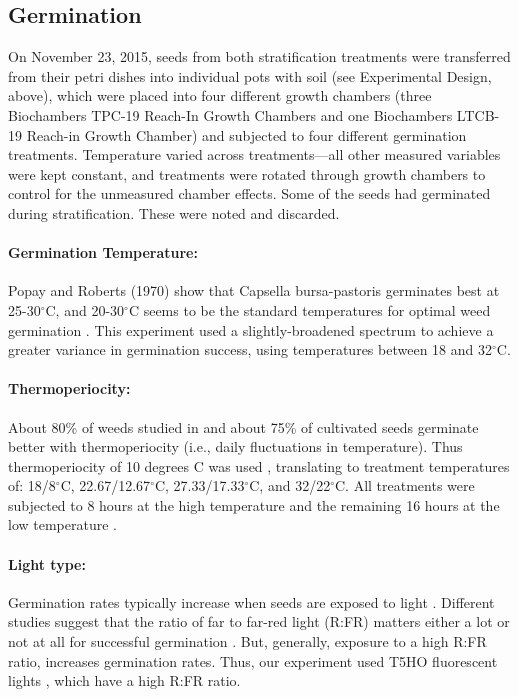 \documentclass[12pt]{article}\usepackage[]{graphicx}\usepackage[]{color}
\begin{document}
	\subsection{Germination }
	On November 23, 2015, seeds from both stratification treatments were transferred from their petri dishes into individual pots with soil (see Experimental Design, above), which were placed into four different growth chambers (three Biochambers TPC-19 Reach-In Growth Chambers and one Biochambers LTCB-19 Reach-in Growth Chamber) and subjected to four different germination treatments. Temperature varied across treatments---all other measured variables were kept constant, and treatments were rotated through growth chambers to control for the unmeasured chamber effects. Some of the seeds had germinated during stratification. These were noted and discarded.
	
	\paragraph{Germination Temperature:} Popay and Roberts (1970) show that Capsella bursa-pastoris germinates best at 25-30$^\circ$C, and 20-30$^\circ$C seems to be the standard temperatures for optimal weed germination \parencite{Hartmann2010,Steinbauer1957,Wulff1994}. This experiment used a slightly-broadened spectrum to achieve a greater variance in germination success, using temperatures between 18 and 32$^\circ$C. 
	
	\paragraph{Thermoperiocity:} About 80\% of weeds studied in \textcite{Steinbauer1957} and about 75\% of cultivated seeds germinate better with thermoperiocity (i.e., daily fluctuations in temperature)\parencite{Toole1963,ISTA1954}. Thus thermoperiocity of 10 degrees C was used \parencite[see e.g.,][]{Steinbauer1957}, translating to treatment temperatures of: 18/8$^\circ$C, 22.67/12.67$^\circ$C, 27.33/17.33$^\circ$C, and 32/22$^\circ$C. All treatments were subjected to 8 hours at the high temperature and the remaining 16 hours at the low temperature \parencite{Baskin1998,Roberts1981,Popay1970,Probert2000}.
	

	\paragraph{Light type:} Germination rates typically increase when seeds are exposed to light \parencite[e.g.,][]{Baskin1998,Pons2000,Popay1970}. Different studies suggest that the ratio of far to far-red light (R:FR) matters either a lot or not at all for successful germination \parencite[e.g.,][]{Popay1970,Pons2000,Wulff1994}. But, generally, exposure to a high R:FR ratio, increases germination rates. Thus, our experiment used T5HO fluorescent lights \parencite{Toole1963}, which have a high R:FR ratio. 
	
\end{document}
